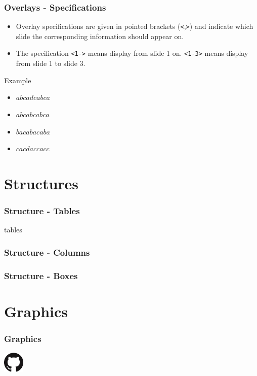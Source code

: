 \documentclass[aspectratio=169,utf8]{ctexbeamer}
\begin{document}
\begin{frame}
  \frametitle{Overlays - Specifications}

  \begin{itemize}
  \item Overlay specifications are given in pointed brackets (\texttt{<},\texttt{>}) and indicate which slide the corresponding information should appear on.
  \item The specification \texttt{<1->} means display from slide 1 on. \texttt{<1-3>} means display from slide 1 to slide 3.
  \end{itemize}

  \begin{block}{Example}

    \begin{itemize}
      \item<1> $abcadcabca$
      \item<1-2> $abcabcabca$
      \item<1> $bacabacaba$
      \item<1,3> $cacdaccacc$
    \end{itemize}
    
  \end{block}
  
\end{frame}


\section{Structures}

\begin{frame}
  \frametitle{Structure - Tables}
  tables
\end{frame}


\begin{frame}
  \frametitle{Structure - Columns}
\end{frame}


\begin{frame}
  \frametitle{Structure - Boxes}
\end{frame}


\section{Graphics}

\begin{frame}
  \frametitle{Graphics}
  \includegraphics[width=1cm]{./figs/GitHub-Mark-120px-plus.png}
\end{frame}
\end{document}

